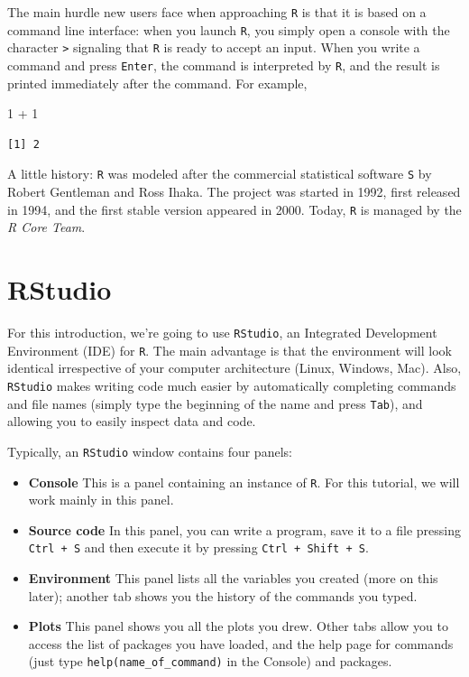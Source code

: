 \documentclass[
  letterpaper,
  DIV=11,
  numbers=noendperiod]{scrreprt}
\newenvironment{Shaded}{\begin{snugshade}}{\end{snugshade}}
\newcommand{\DecValTok}[1]{\textcolor[rgb]{0.68,0.00,0.00}{#1}}
\newcommand{\SpecialCharTok}[1]{\textcolor[rgb]{0.37,0.37,0.37}{#1}}
\providecommand{\tightlist}{%
  \setlength{\itemsep}{0pt}\setlength{\parskip}{0pt}}\usepackage{longtable,booktabs,array}
\begin{document}
The main hurdle new users face when approaching \texttt{R} is that it is
based on a command line interface: when you launch \texttt{R}, you
simply open a console with the character \texttt{\textgreater{}}
signaling that \texttt{R} is ready to accept an input. When you write a
command and press \texttt{Enter}, the command is interpreted by
\texttt{R}, and the result is printed immediately after the command. For
example,

\begin{Shaded}
\begin{Highlighting}[]
\DecValTok{1} \SpecialCharTok{+} \DecValTok{1}
\end{Highlighting}
\end{Shaded}

\begin{verbatim}
[1] 2
\end{verbatim}

A little history: \texttt{R} was modeled after the commercial
statistical software \texttt{S} by Robert Gentleman and Ross Ihaka. The
project was started in 1992, first released in 1994, and the first
stable version appeared in 2000. Today, \texttt{R} is managed by the
\emph{R Core Team}.

\hypertarget{rstudio}{%
\section{RStudio}\label{rstudio}}

For this introduction, we're going to use \texttt{RStudio}, an
Integrated Development Environment (IDE) for \texttt{R}. The main
advantage is that the environment will look identical irrespective of
your computer architecture (Linux, Windows, Mac). Also, \texttt{RStudio}
makes writing code much easier by automatically completing commands and
file names (simply type the beginning of the name and press
\texttt{Tab}), and allowing you to easily inspect data and code.

Typically, an \texttt{RStudio} window contains four panels:

\begin{itemize}
\tightlist
\item
  \textbf{Console} This is a panel containing an instance of \texttt{R}.
  For this tutorial, we will work mainly in this panel.
\item
  \textbf{Source code} In this panel, you can write a program, save it
  to a file pressing \texttt{Ctrl\ +\ S} and then execute it by pressing
  \texttt{Ctrl\ +\ Shift\ +\ S}.
\item
  \textbf{Environment} This panel lists all the variables you created
  (more on this later); another tab shows you the history of the
  commands you typed.
\item
  \textbf{Plots} This panel shows you all the plots you drew. Other tabs
  allow you to access the list of packages you have loaded, and the help
  page for commands (just type \texttt{help(name\_of\_command)} in the
  Console) and packages.
\end{itemize}
\end{document}
